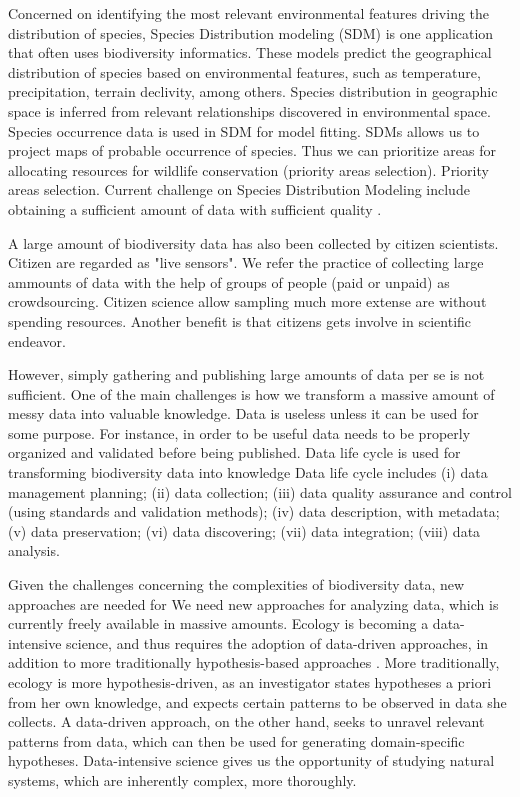Concerned on identifying the most relevant environmental features driving the distribution of species, Species Distribution modeling (SDM) is one application that often uses biodiversity informatics.
These models predict the geographical distribution of species based on environmental features, such as temperature, precipitation, terrain declivity, among others.
Species distribution in geographic space is inferred from relevant relationships discovered in environmental space.
Species occurrence data is used in SDM for model fitting. 
SDMs allows us to project maps of probable occurrence of species.
Thus we can prioritize areas for allocating resources for wildlife conservation (priority areas selection).
Priority areas selection. %
Current challenge on Species Distribution Modeling include obtaining a sufficient amount of data with sufficient quality \cite{Araujo2006}.




A large amount of biodiversity data has also been collected by citizen scientists. 
Citizen are regarded as "live sensors".
We refer the practice of collecting large ammounts of data with the help of groups of people (paid or unpaid) as crowdsourcing.
Citizen science allow sampling much more extense are without spending resources.
Another benefit is that citizens gets involve in scientific endeavor.


However, simply gathering and publishing large amounts of data per se is not sufficient.
One of the main challenges is how we transform a massive amount of messy data into valuable knowledge.
Data is useless unless it can be used for some purpose.
For instance, in order to be useful data needs to be properly organized and validated before being published.
Data life cycle is used for transforming biodiversity data into knowledge \cite{Michener2012}
Data life cycle includes (i) data management planning; (ii) data collection; (iii) data quality assurance and control (using standards and validation methods); (iv) data description, with metadata; (v) data preservation; (vi) data discovering; (vii) data integration; (viii) data analysis. 


Given the challenges concerning the complexities of biodiversity data, new approaches are needed for
We need new approaches for analyzing data, which is currently freely available in massive amounts.
Ecology is becoming a data-intensive science, and thus requires the adoption of data-driven approaches, in addition to more traditionally hypothesis-based approaches \cite{Kelling2009}.
More traditionally, ecology is more hypothesis-driven, as an investigator states hypotheses a priori from her own knowledge, and expects certain patterns to be observed in data she collects.
A data-driven approach, on the other hand, seeks to unravel relevant patterns from data, which can then be used for generating domain-specific hypotheses.
Data-intensive science gives us the opportunity of studying natural systems, which are inherently complex, more thoroughly.


